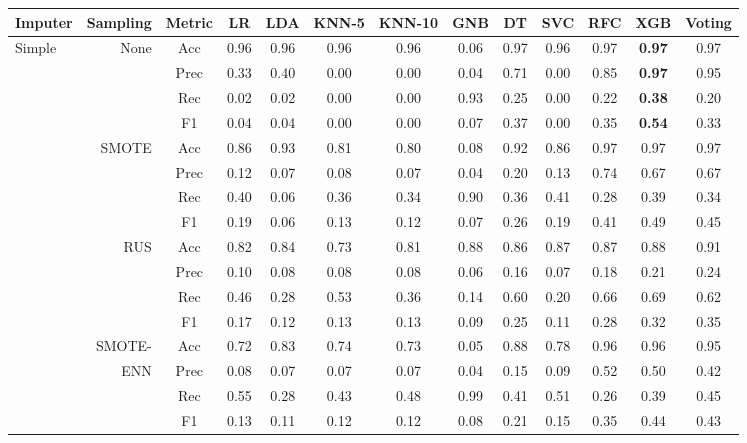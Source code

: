 \begin{table*}
\ContinuedFloat
\begin{narrow}{-1cm}{-1cm}
\begin{subtable}[t]{2.05\columnwidth}
    \centering
    \begin{tabular}{l|r|c|cccccccccc}
       Imputer & Sampling & Metric & LR & LDA & KNN-5 & KNN-10 & GNB & DT & SVC & RFC & XGB & Voting \\
        \hline \hline
                
        Simple & None & Acc & 0.96 & 0.96 & 0.96 & 0.96 & 0.06 & 0.97 & 0.96 & 0.97 & \textbf{0.97} & 0.97 \\
        ~ & ~ & Prec & 0.33 & 0.40 & 0.00 & 0.00 & 0.04 & 0.71 & 0.00 & 0.85 & \textbf{0.97} & 0.95 \\
        ~ & ~ & Rec & 0.02 & 0.02 & 0.00 & 0.00 & 0.93 & 0.25 & 0.00 & 0.22 & \textbf{0.38} & 0.20 \\
        ~ & ~ & F1 & 0.04 & 0.04 & 0.00 & 0.00 & 0.07 & 0.37 & 0.00 & 0.35 & \textbf{0.54} & 0.33 \\
        \cline{2-13}
        ~ & SMOTE & Acc & 0.86 & 0.93 & 0.81 & 0.80 & 0.08 & 0.92 & 0.86 & 0.97 & 0.97 & 0.97 \\
        ~ & ~ & Prec & 0.12 & 0.07 & 0.08 & 0.07 & 0.04 & 0.20 & 0.13 & 0.74 & 0.67 & 0.67 \\
        ~ & ~ & Rec & 0.40 & 0.06 & 0.36 & 0.34 & 0.90 & 0.36 & 0.41 & 0.28 & 0.39 & 0.34 \\
        ~ & ~ & F1 & 0.19 & 0.06 & 0.13 & 0.12 & 0.07 & 0.26 & 0.19 & 0.41 & 0.49 & 0.45 \\
        \cline{2-13}
        ~ & RUS & Acc & 0.82 & 0.84 & 0.73 & 0.81 & 0.88 & 0.86 & 0.87 & 0.87 & 0.88 & 0.91 \\
        ~ & ~ & Prec & 0.10 & 0.08 & 0.08 & 0.08 & 0.06 & 0.16 & 0.07 & 0.18 & 0.21 & 0.24 \\
        ~ & ~ & Rec & 0.46 & 0.28 & 0.53 & 0.36 & 0.14 & 0.60 & 0.20 & 0.66 & 0.69 & 0.62 \\
        ~ & ~ & F1 & 0.17 & 0.12 & 0.13 & 0.13 & 0.09 & 0.25 & 0.11 & 0.28 & 0.32 & 0.35 \\
        \cline{2-13}
        ~ & SMOTE- & Acc & 0.72 & 0.83 & 0.74 & 0.73 & 0.05 & 0.88 & 0.78 & 0.96 & 0.96 & 0.95 \\
        ~ & ENN & Prec & 0.08 & 0.07 & 0.07 & 0.07 & 0.04 & 0.15 & 0.09 & 0.52 & 0.50 & 0.42 \\
        ~ & ~ & Rec & 0.55 & 0.28 & 0.43 & 0.48 & 0.99 & 0.41 & 0.51 & 0.26 & 0.39 & 0.45 \\
        ~ & ~ & F1 & 0.13 & 0.11 & 0.12 & 0.12 & 0.08 & 0.21 & 0.15 & 0.35 & 0.44 & 0.43 \\
        \hline\hline
        

\end{tabular}
\end{subtable}
\end{narrow}
\end{table*}
